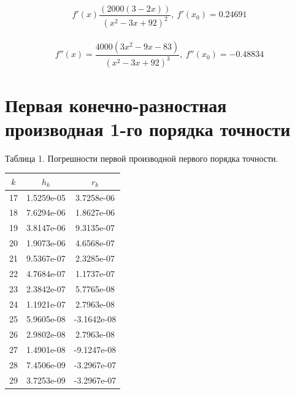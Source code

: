 \documentclass{article}
\begin{document}
	\begin{flushleft}
		\[f'(x) \dfrac{(2000(3-2x))}{(x^2-3x+92)^2},~f'(x_0) = 0.24691 \]\\
		
		\[f''(x)= \dfrac{4000\left(3x^2-9x-83\right)}{\left(x^2-3x+92\right)^3},~f''(x_0) = -0.48834\]
	\end{flushleft}
	
	\section{Первая конечно-разностная производная 1-го порядка точности}
		\begin{flushright}
			Таблица 1. Погрешности первой производной первого порядка точности.
		\end{flushright}
		
			\begin{table}[h!]
				\centering
				\begin{tabular}{|l|l|l|}
					\hline
					\multicolumn{1}{|c|}{$k$}  & \multicolumn{1}{c|}{$h_k$}       & \multicolumn{1}{c|}{$r_k$}    \\ \hline
					\multicolumn{1}{|c|}{17} & \multicolumn{1}{c|}{1.5259e-05} & \multicolumn{1}{c|}{3.7258e-06}  \\ \hline
					\multicolumn{1}{|c|}{18} & \multicolumn{1}{c|}{7.6294e-06} & \multicolumn{1}{c|}{1.8627e-06}  \\ \hline
					\multicolumn{1}{|c|}{19} & \multicolumn{1}{c|}{3.8147e-06} & \multicolumn{1}{c|}{9.3135e-07}  \\ \hline
					\multicolumn{1}{|c|}{20} & \multicolumn{1}{c|}{1.9073e-06} & \multicolumn{1}{c|}{4.6568e-07}  \\ \hline
					\multicolumn{1}{|c|}{21} & \multicolumn{1}{c|}{9.5367e-07} & \multicolumn{1}{c|}{2.3285e-07}  \\ \hline
					\multicolumn{1}{|c|}{22} & \multicolumn{1}{c|}{4.7684e-07} & \multicolumn{1}{c|}{1.1737e-07}  \\ \hline
					\multicolumn{1}{|c|}{23} & \multicolumn{1}{c|}{2.3842e-07} & \multicolumn{1}{c|}{5.7765e-08}  \\ \hline
					\multicolumn{1}{|c|}{24} & \multicolumn{1}{c|}{1.1921e-07} & \multicolumn{1}{c|}{2.7963e-08}  \\ \hline
					\multicolumn{1}{|c|}{25} & \multicolumn{1}{c|}{5.9605e-08} & \multicolumn{1}{c|}{-3.1642e-08} \\ \hline
					\multicolumn{1}{|c|}{26} & \multicolumn{1}{c|}{2.9802e-08} & \multicolumn{1}{c|}{2.7963e-08}  \\ \hline
					\multicolumn{1}{|c|}{27} & \multicolumn{1}{c|}{1.4901e-08} & \multicolumn{1}{c|}{-9.1247e-08} \\ \hline
					\multicolumn{1}{|c|}{28} & \multicolumn{1}{c|}{7.4506e-09} & \multicolumn{1}{c|}{-3.2967e-07} \\ \hline
					\multicolumn{1}{|c|}{29} & \multicolumn{1}{c|}{3.7253e-09} & \multicolumn{1}{c|}{-3.2967e-07} \\ \hline
					
				\end{tabular}
			\end{table}
		
\end{document}
